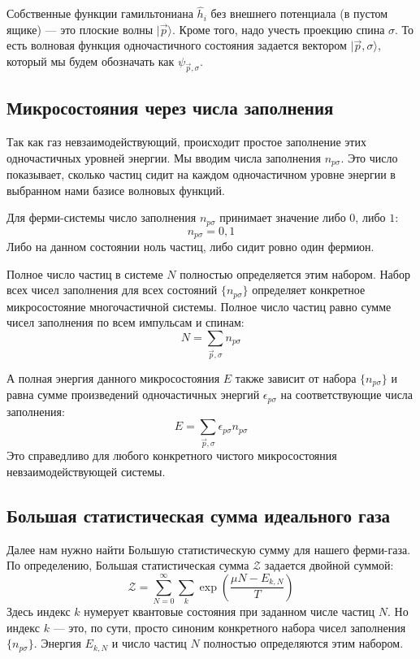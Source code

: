 \documentclass[../general/general]{subfiles}
\begin{document}
Собственные функции гамильтониана $\hat{h}_i$ без внешнего потенциала (в пустом ящике) — это плоские волны $|\vec{p}\rangle$. Кроме того, надо учесть проекцию спина $\sigma$. То есть волновая функция одночастичного состояния задается вектором $|\vec{p}, \sigma\rangle$, который мы будем обозначать как $\psi_{\vec{p}, \sigma}$.

\subsection{Микросостояния через числа заполнения}

Так как газ невзаимодействующий, происходит простое заполнение этих одночастичных уровней энергии. Мы вводим числа заполнения $n_{p\sigma}$. Это число показывает, сколько частиц сидит на каждом одночастичном уровне энергии в выбранном нами базисе волновых функций. 

Для ферми-системы число заполнения $n_{p\sigma}$ принимает значение либо $0$, либо $1$:
\begin{equation}
    n_{p\sigma} = 0, 1
\end{equation}
Либо на данном состоянии ноль частиц, либо сидит ровно один фермион. 

Полное число частиц в системе $N$ полностью определяется этим набором. Набор всех чисел заполнения для всех состояний $\{n_{p\sigma}\}$ определяет конкретное микросостояние многочастичной системы. Полное число частиц равно сумме чисел заполнения по всем импульсам и спинам:
\begin{equation}
    N = \sum_{\vec{p}, \sigma} n_{p\sigma}
\end{equation}

А полная энергия данного микросостояния $E$ также зависит от набора $\{n_{p\sigma}\}$ и равна сумме произведений одночастичных энергий $\epsilon_{p\sigma}$ на соответствующие числа заполнения:
\begin{equation}
    E = \sum_{\vec{p}, \sigma} \epsilon_{p\sigma} n_{p\sigma}
\end{equation}
Это справедливо для любого конкретного чистого микросостояния невзаимодействующей системы.

\subsection{Большая статистическая сумма идеального газа}

Далее нам нужно найти Большую статистическую сумму для нашего ферми-газа. По определению, Большая статистическая сумма $\mathcal{Z}$ задается двойной суммой:
\begin{equation}
    \mathcal{Z} = \sum_{N=0}^{\infty} \sum_{k} \exp\left( \frac{\mu N - E_{k,N}}{T} \right)
\end{equation}
Здесь индекс $k$ нумерует квантовые состояния при заданном числе частиц $N$. Но индекс $k$ — это, по сути, просто синоним конкретного набора чисел заполнения $\{n_{p\sigma}\}$. Энергия $E_{k,N}$ и число частиц $N$ полностью определяются этим набором.
\end{document}
